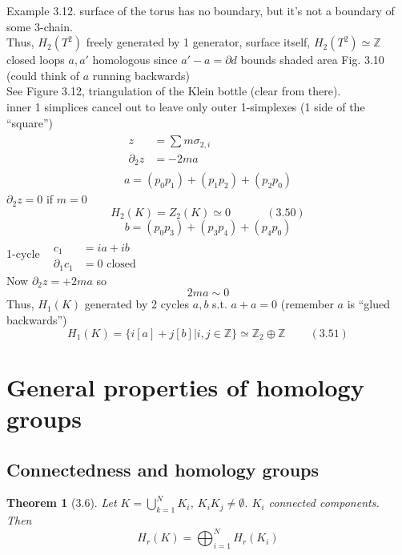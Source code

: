 \documentclass{book}
\newtheorem{theorem}{Theorem}
\begin{document}
Example 3.12. surface of the torus has no boundary, but it's not a boundary of some 3-chain.  \\
Thus, $H_2(T^2)$ freely generated by 1 generator, surface itself, $H_2(T^2) \simeq \mathbb{Z}$ \\
closed loops $a,a'$ homologous since $a'-a = \partial d$ bounds shaded area Fig. 3.10 (could think of $a$ running backwards) \\
See Figure 3.12, triangulation of the Klein bottle (clear from there). \\
inner 1 simplices cancel out to leave only outer 1-simplexes (1 side of the ``square'')
\[
\begin{gathered}
  \begin{aligned}
    z & = \sum m \sigma_{2,i} \\ 
    \partial_2 z & = -2ma  \end{aligned} \\ 
  a = (p_0 p_1 ) + (p_1 p_2 ) + ( p_2 p_0)
\end{gathered}
\]
$\partial_2z =0$ if $m=0$ 
\begin{equation}
  H_2(K) = Z_2(K) \simeq 0 \quad \quad \quad \, (3.50)
\end{equation}
\[
b = (p_0 p_3) + (p_3 p_4) + (p_4p_0)
\]
1-cycle \, $\begin{aligned} & \quad \\ 
  c_1 & = ia + ib \\
  \partial_1 c_1 & = 0 \text{ closed } \end{aligned}$ \\
Now $\partial_2 z = + 2 m a$ so 
\[
2ma \sim 0
\]
Thus, $H_1(K)$ generated by 2 cycles $a,b$ s.t. $a+a =0$ (remember $a$ is ``glued backwards'')
\begin{equation}
  H_1(K) = \lbrace i [a] + j[b] | i,j \in \mathbb{Z} \rbrace \simeq \mathbb{Z}_2 \oplus \mathbb{Z} \quad \quad \, (3.51) 
\end{equation}
\section{General properties of homology groups}

\subsection{Connectedness and homology groups}

\begin{theorem}[3.6] Let $K  = \bigcup_{k=1}^N K_i$, $K_i K_j \neq \emptyset$.  $K_i$ connected components.  \\
Then 
\[
H_r(K) = \bigoplus_{i=1}^N H_r(K_i)
\]
\end{theorem}
\end{document}
